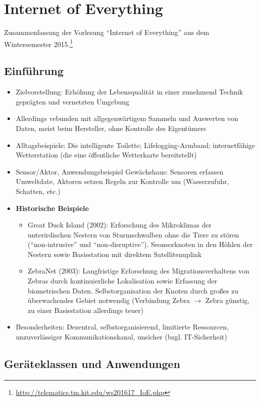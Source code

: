\chapter{Internet of Everything}

Zusammenfassung der Vorlesung "`Internet of Everything"' aus dem Wintersemester 2015.\footnote{\url{http://telematics.tm.kit.edu/ws201617_IoE.php}}

\section{Einführung}
\begin{itemize}
	\item Zielvorstellung: Erhöhung der Lebensqualität in einer zunehmend Technik geprägten und vernetzten Umgebung
	\item Allerdings vebunden mit allgegenwärtigem Sammeln und Auswerten von Daten, meist beim Hersteller, ohne Kontrolle des Eigentümers
	\item Alltagsbeispiele: Die intelligente Toilette; Lifelogging-Armband; internetfähige Wetterstation (die eine öffentliche Wetterkarte bereitstellt)
	\item Sensor/Aktor, Anwendungsbeispiel Gewächshaus: Sensoren erfassen Umweltdate, Aktoren setzen Regeln zur Kontrolle um (Wasserzufuhr, Schatten, etc.)
	\item \textbf{Historische Beispiele}
	\begin{itemize}
		\item Great Duck Island (2002): Erforschung des Mikroklimas der unterirdischen Nestern von Sturmschwalben ohne die Tiere zu stören ("`non-intrusive"' und "`non-disruptive"'). Seonsorknoten in den Höhlen der Nestern sowie Basisstation mit direktem Satellitenuplink
		\item ZebraNet (2003): Langfristige Erforschung des Migrationsverhaltens von Zebras durch kontinuierliche Lokalisation sowie Erfassung der biometrischen Daten. Selbstorganisation der Knoten durch großes zu überwachendes Gebiet notwendig (Verbindung Zebra \(\rightarrow\) Zebra günstig, zu einer Basisstation allerdings teuer)
	\end{itemize}
	\item Besonderheiten: Dezentral, selbstorganisierend, limitierte Ressourcen, unzuverlässiger Kommunikationskanal, unsicher (bzgl. IT-Sicherheit)
\end{itemize}



\section{Geräteklassen und Anwendungen}

